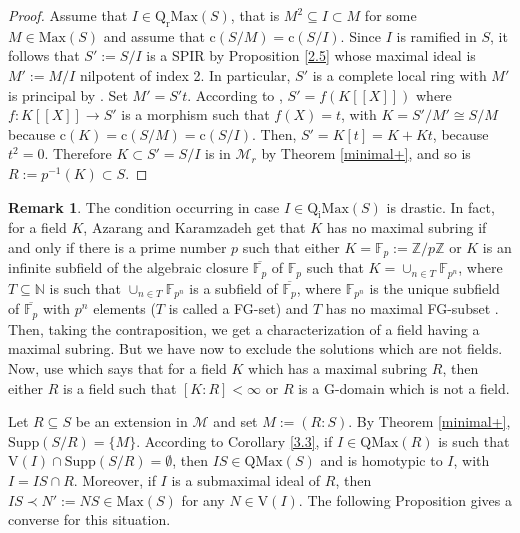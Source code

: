 \documentclass[12pt,leqno]{amsart}
\theoremstyle{definition}
\newtheorem{remark}[theorem]{Remark}
\begin{document}
\begin{proof}
Assume that $I\in\mathrm{Q_rMax}(S)$, that is $M^2\subseteq I\subset M$ for some $M\in\mathrm{Max}(S)$ and assume that $\mathrm{c}(S/M)=\mathrm{c}(S/I)$. Since $I$ is ramified in $S$, it follows that $S':=S/I$ is a SPIR by Proposition \ref{2.5} whose maximal ideal is $M':=M/I$ nilpotent of index 2. In particular, $S'$ is a complete local ring with $M'$ is principal by \cite[Definition 9]{Hun}. Set $M'=S't$. According to \cite[Theorem 8]{Hun}, $S'=f(K[[X]])$ where $f:K[[X]]\to S'$ is a morphism such that $f(X)=t$, with $K=S'/M'\cong S/M$ because $\mathrm{c}(K)=\mathrm{c}(S/M)=\mathrm {c}(S/I)$. Then, $S'=K[t]=K+Kt$, because $t^2=0$. Therefore $K\subset S' =S/I$ is in $\mathcal M_r$ by Theorem \ref{minimal+}, and so is $R:=p^{-1}(K)\subset S$. 
\end{proof}

\begin{remark}\label{4.14}The condition occurring in case $I\in\mathrm{Q_i Max}(S)$ is drastic. In fact, for a field $K$, Azarang and Karamzadeh get that $K$ has no maximal subring if and only if there is a prime number $p$ such that either $K=\mathbb F_p:=\mathbb Z/p\mathbb Z$ or $K$ is an infinite subfield of the algebraic closure $\overline{\mathbb F_p}$ of $\mathbb F_p$ such that $K=\cup_{n\in T}\mathbb F_{p^n}$, where $T\subseteq\mathbb N$ is such that $\cup_{n\in T}\mathbb F_{p^n}$ is a subfield of $\overline{\mathbb F_p}$, where $\mathbb F_{p^n}$ is the unique subfield of $\overline{\mathbb F_p}$ with $p^n$ elements ($T$ is called a FG-set) and $T$ has no maximal FG-subset \cite[Theorem 1.8] {AK}. Then, taking the contraposition, we get a characterization of a field having a maximal subring. But we have now to exclude the solutions which are not fields. Now, use \cite[Theorem 3.3]{AZ} which says that for a field $ K$ which has a maximal subring $R$, then either $R$ is a field such that $[K:R]<\infty$ or $R$ is a G-domain which is not a field.  
\end{remark}

Let $R\subseteq S$ be an extension in $\mathcal M$ and set $M:=(R:S)$. By Theorem \ref{minimal+}, $\mathrm{Supp}(S/R)=\{M\}$. According to Corollary \ref{3.3}, if $I\in\mathrm{QMax}(R)$ is such that $\mathrm{V}(I)\cap\mathrm{Supp}(S/R)=\emptyset$, then $IS\in\mathrm{QMax}(S)$ and is homotypic to $I$, with $I=IS\cap R$. Moreover, if $I$ is a submaximal ideal of $R$, then $IS\prec N':=NS\in\mathrm{Max}(S)$ for any $N\in\mathrm {V}(I)$. The following Proposition gives a converse for this situation. 
\end{document}
